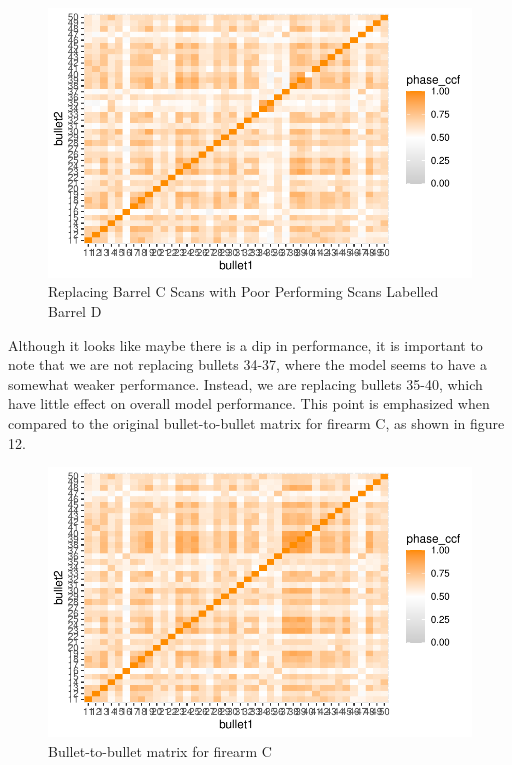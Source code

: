 \documentclass[
  number]{elsarticle}
\begin{document}
\begin{figure}[H]

{\centering \includegraphics{Interactive-Visualization-Framework_files/figure-pdf/unnamed-chunk-8-1.pdf}

}

\caption{Replacing Barrel C Scans with Poor Performing Scans Labelled
Barrel D}

\end{figure}

Although it looks like maybe there is a dip in performance, it is
important to note that we are not replacing bullets 34-37, where the
model seems to have a somewhat weaker performance. Instead, we are
replacing bullets 35-40, which have little effect on overall model
performance. This point is emphasized when compared to the original
bullet-to-bullet matrix for firearm C, as shown in figure 12.

\begin{figure}[H]

{\centering \includegraphics{Interactive-Visualization-Framework_files/figure-pdf/unnamed-chunk-9-1.pdf}

}

\caption{Bullet-to-bullet matrix for firearm C}

\end{figure}
\end{document}
